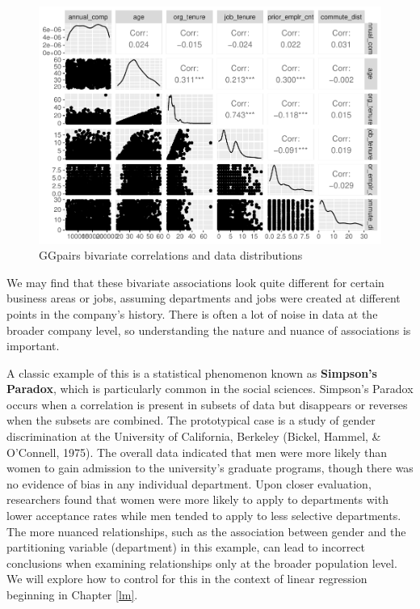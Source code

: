 \documentclass[
]{book}
\begin{document}
\begin{figure}

{\centering \includegraphics[width=1\linewidth]{The_Fundamentals_of_People_Analytics_files/figure-latex/ggpairs-comp-1} 

}

\caption{GGpairs bivariate correlations and data distributions}\label{fig:ggpairs-comp}
\end{figure}

We may find that these bivariate associations look quite different for certain business areas or jobs, assuming departments and jobs were created at different points in the company's history. There is often a lot of noise in data at the broader company level, so understanding the nature and nuance of associations is important.

A classic example of this is a statistical phenomenon known as \textbf{Simpson's Paradox}, which is particularly common in the social sciences. Simpson's Paradox occurs when a correlation is present in subsets of data but disappears or reverses when the subsets are combined. The prototypical case is a study of gender discrimination at the University of California, Berkeley (Bickel, Hammel, \& O'Connell, 1975). The overall data indicated that men were more likely than women to gain admission to the university's graduate programs, though there was no evidence of bias in any individual department. Upon closer evaluation, researchers found that women were more likely to apply to departments with lower acceptance rates while men tended to apply to less selective departments. The more nuanced relationships, such as the association between gender and the partitioning variable (department) in this example, can lead to incorrect conclusions when examining relationships only at the broader population level. We will explore how to control for this in the context of linear regression beginning in Chapter \ref{lm}.
\end{document}
